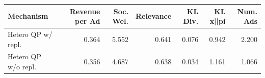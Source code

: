 \begin{tabular}{lrrrrrr}
\hline
Mechanism & Revenue per Ad & Soc. Wel. & Relevance & KL Div. & KL x||pi & Num. Ads \\
\hline
Hetero QP w/ repl. & 0.364 & 5.552 & 0.641 & 0.076 & 0.942 & 2.200 \\
Hetero QP w/o repl. & 0.356 & 4.687 & 0.638 & 0.034 & 1.161 & 1.066 \\
\hline
\end{tabular}
